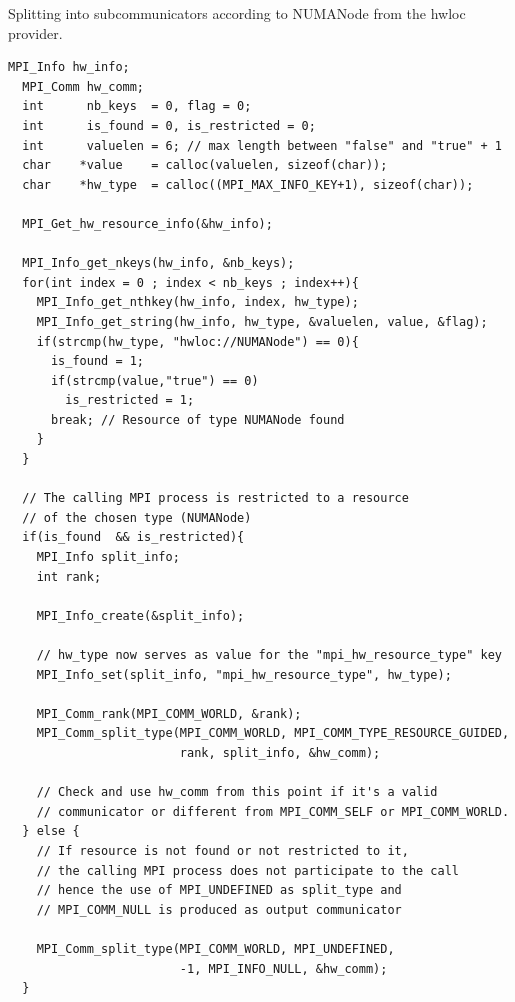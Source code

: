 \begin{example}
\label{ex:split-with-resrc-info}
%
 Splitting  into subcommunicators according to
 \gb\mbox{NUMANode} from the hwloc provider.
\begin{lstlisting}[language={[MPI]C}]
  MPI_Info hw_info;
  MPI_Comm hw_comm;
  int      nb_keys  = 0, flag = 0;
  int      is_found = 0, is_restricted = 0; 
  int      valuelen = 6; // max length between "false" and "true" + 1 
  char    *value    = calloc(valuelen, sizeof(char));
  char    *hw_type  = calloc((MPI_MAX_INFO_KEY+1), sizeof(char));
  
  MPI_Get_hw_resource_info(&hw_info);
  
  MPI_Info_get_nkeys(hw_info, &nb_keys);  
  for(int index = 0 ; index < nb_keys ; index++){
    MPI_Info_get_nthkey(hw_info, index, hw_type);
    MPI_Info_get_string(hw_info, hw_type, &valuelen, value, &flag);     
    if(strcmp(hw_type, "hwloc://NUMANode") == 0){
      is_found = 1;
      if(strcmp(value,"true") == 0)
        is_restricted = 1;
      break; // Resource of type NUMANode found
    }
  }

  // The calling MPI process is restricted to a resource
  // of the chosen type (NUMANode)
  if(is_found  && is_restricted){
    MPI_Info split_info;
    int rank;
    
    MPI_Info_create(&split_info);
    
    // hw_type now serves as value for the "mpi_hw_resource_type" key
    MPI_Info_set(split_info, "mpi_hw_resource_type", hw_type);

    MPI_Comm_rank(MPI_COMM_WORLD, &rank);
    MPI_Comm_split_type(MPI_COMM_WORLD, MPI_COMM_TYPE_RESOURCE_GUIDED,
                        rank, split_info, &hw_comm);

    // Check and use hw_comm from this point if it's a valid
    // communicator or different from MPI_COMM_SELF or MPI_COMM_WORLD.
  } else {
    // If resource is not found or not restricted to it,
    // the calling MPI process does not participate to the call
    // hence the use of MPI_UNDEFINED as split_type and    
    // MPI_COMM_NULL is produced as output communicator
    
    MPI_Comm_split_type(MPI_COMM_WORLD, MPI_UNDEFINED,
                        -1, MPI_INFO_NULL, &hw_comm);       
  }  
\end{lstlisting}
\end{example}

